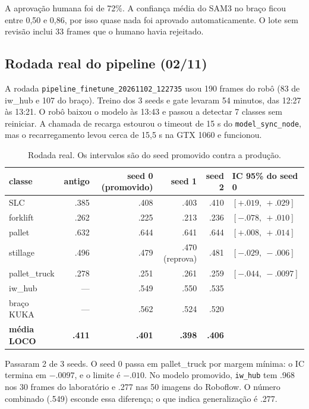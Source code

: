 \documentclass[11pt,a4paper]{article}
\begin{document}
A aprovação humana foi de 72\%. A confiança média do SAM3 no braço ficou entre
0,50 e 0,86, por isso quase nada foi aprovado automaticamente. O lote sem
revisão inclui 33 frames que o humano havia rejeitado.

\subsection{Rodada real do pipeline (02/11)}

A rodada \texttt{pipeline\_finetune\_20261102\_122735} usou 190 frames do robô
(83 de iw\_hub e 107 do braço). Treino dos 3 seeds e gate levaram 54 minutos,
das 12:27 às 13:21. O robô baixou o modelo às 13:43 e passou a detectar 7
classes sem reiniciar. A chamada de recarga estourou o timeout de 15 s do
\texttt{model\_sync\_node}, mas o recarregamento levou cerca de 15,5 s na GTX
1060 e funcionou.

\begin{table}[H]
\centering\small
\caption{Rodada real. Os intervalos são do seed promovido contra a produção.}
\label{tab:rodada}
\begin{tabular}{lrrrrl}
\toprule
classe & antigo & seed 0 (promovido) & seed 1 & seed 2 & IC 95\% do seed 0 \\
\midrule
SLC & .385 & .408 & .403 & .410 & $[+.019,\ +.029]$ \\
forklift & .262 & .225 & .213 & .236 & $[-.078,\ +.010]$ \\
pallet & .632 & .644 & .641 & .644 & $[+.008,\ +.014]$ \\
stillage & .496 & .479 & .470 (reprova) & .481 & $[-.029,\ -.006]$ \\
pallet\_truck & .278 & .251 & .261 & .259 & $[-.044,\ -.0097]$ \\
iw\_hub & --- & .549 & .550 & .535 & \\
braço KUKA & --- & .562 & .524 & .520 & \\
\textbf{média LOCO} & \textbf{.411} & \textbf{.401} & \textbf{.398} & \textbf{.406} & \\
\bottomrule
\end{tabular}
\end{table}

Passaram 2 de 3 seeds. O seed 0 passa em pallet\_truck por margem mínima: o IC
termina em $-.0097$, e o limite é $-.010$. No modelo promovido, \texttt{iw\_hub}
tem .968 nos 30 frames do laboratório e .277 nas 50 imagens do Roboflow. O
número combinado (.549) esconde essa diferença; o que indica generalização é
.277.
\end{document}
